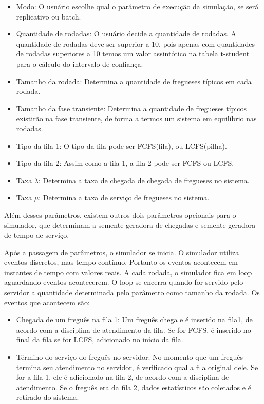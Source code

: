 \documentclass[a4paper,10pt]{article}
\begin{document}
\begin {itemize}
\item Modo: O usuário escolhe qual o parâmetro de execução da simulação, se será replicativo ou batch.

\item Quantidade de rodadas: O usuário decide a quantidade de rodadas. A quantidade de rodadas deve ser superior a 10, pois apenas com quantidades de rodadas
superiores a 10 temos um valor assintótico na tabela t-student para o cálculo do intervalo de confiança.

\item Tamanho da rodada: Determina a quantidade de fregueses típicos em cada rodada.

\item Tamanho da fase transiente: Determina a quantidade de fregueses típicos existirão na fase transiente, de forma a termos um sistema em equilíbrio nas rodadas.

\item Tipo da fila 1: O tipo da fila pode ser FCFS(fila), ou LCFS(pilha).

\item Tipo da fila 2: Assim como a fila 1, a fila 2 pode ser FCFS ou LCFS.

\item Taxa $\lambda$: Determina a taxa de chegada de chegada de fregueses no sistema.

\item Taxa $\mu$: Determina a taxa de serviço de fregueses no sistema.
\end {itemize}

    Além desses parâmetros, existem outros dois parâmetros opcionais para o simulador, que determinam a semente geradora de chegadas e semente geradora
de tempo de serviço.

    Após a passagem de parâmetros, o simulador se inicia. O simulador utiliza eventos discretos, mas tempo contínuo. Portanto os eventos acontecem em instantes
de tempo com valores reais. A cada rodada, o simulador fica em loop aguardando eventos acontecerem. O loop se encerra quando for servido pelo
servidor a quantidade determinada pelo parâmetro como tamanho da rodada. Os eventos que acontecem são:

\begin {itemize}
\item Chegada de um freguês na fila 1: Um freguês chega e é inserido na fila1, de acordo com a disciplina de atendimento da fila. Se for FCFS, é inserido no final da fila
se for LCFS, adicionado no início da fila.

\item Término do serviço do freguês no servidor: No momento que um freguês termina seu atendimento no servidor, é verificado qual a fila original dele. Se for a fila 1,
ele é adicionado na fila 2, de acordo com a disciplina de atendimento. Se o freguês era da fila 2, dados estatísticos são coletados e é retirado do sistema.
\end {itemize}
\end{document}
